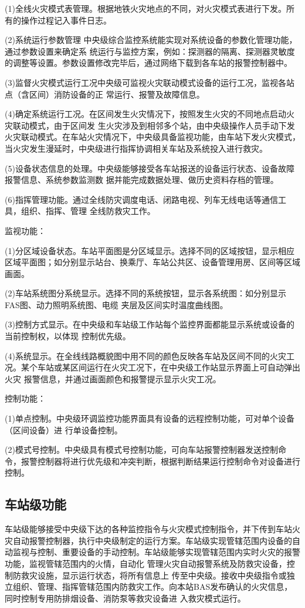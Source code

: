 (1)全线火灾模式表管理。根据地铁火灾地点的不同，对火灾模式表进行下发。所有的操作过程记入事件日志。\par 
(2)系统运行参数管理
中央级综合监控系统能实现对系统设备的参数化管理功能，通过参数设置来确定系 统运行与监控方案，例如：探测器的隔离、探测器灵敏度的调整等设置。参数设置修改完毕后，通过网络下载到各车站的报警控制器中。\par 
(3)监督火灾模式运行工况中央级可监视火灾联动模式设备的运行工况，监视各站点（含区间）消防设备的正 常运行、报警及故障信息。\par 
(4)确定系统运行工况。在区间发生火灾情况下，按照发生火灾的不同地点启动火灾联动模式，由于区间发 生火灾涉及到相邻多个站，由中央级操作人员手动下发火灾联动模式。在车站火灾情况下，中央级具备监视功能，由车站下发火灾模式，当火灾发生漫延时，中央级进行指挥协调相关车站及系统投入进行救灾。\par 
(5)设备状态信息的处理。中央级能够接受各车站报送的设备运行状态、设备故障报警信息、系统参数监测数 据并能完成数据处理、做历史资料存档的管理。\par 
(6)指挥管理功能。通过全线防灾调度电话、闭路电视、列车无线电话等通信工具，组织、指挥、管理 全线防救灾工作。

监视功能：

(1)分区域设备状态。车站平面图是分区域显示。选择不同的区域按钮，显示相应区域平面图；如分别显示站台、换乘厅、车站公共区、设备管理用房、区间等区域画面。\par
(2)车站系统图分系统显示。选择不同的系统按钮，显示各系统图：如分别显示FAS图、动力照明系统图、电缆 夹层及区间实时温度曲线图。\par
(3)控制方式显示。在中央级和车站级工作站每个监控界面都能显示系统或设备的当前控制权，以体现 控制优先级。\par
(4)系统显示。在全线线路概貌图中用不同的颜色反映各车站及区间不同的火灾工况。某个车站或某区间运行在火灾工况下，在中央级工作站显示界面上可自动弹出火灾 报警信息，并通过画面颜色和报警提示显示火灾工况。

控制功能：

(1)单点控制。中央级环调监控功能界面具有设备的远程控制功能，可对单个设备（区间设备）进 行单设备控制。\par
(2)模式号控制。中央级具有模式号控制功能，可向车站报警控制器发送控制命令，报警控制器将进行优先级和冲突判断，根据判断结果运行控制命令对设备进行控制。
\subsection{车站级功能}
车站级能够接受中央级下达的各种监控指令与火灾模式控制指令，并下传到车站火 灾自动报警控制器，执行中央级制定的运行方案。车站级实现管辖范围内设备的自动监视与控制、重要设备的手动控制。车站级能够实现管辖范围内实时火灾的报警功能，监视管辖范围内的火情，自动化 管理火灾自动报警系统及防救灾设备，控制防救灾设施，显示运行状态，将所有信息上 传至中央级。接收中央级指令或独立组织、管理、指挥管辖范围内防救灾工作。向本站BAS发布确认的火灾信息，同时控制专用防排烟设备、消防泵等救灾设备进 入救灾模式运行。

